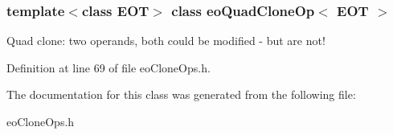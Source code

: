 \subsubsection*{template$<$class EOT$>$ class eo\-Quad\-Clone\-Op$<$ EOT $>$}

Quad clone: two operands, both could be modified - but are not! 



Definition at line 69 of file eo\-Clone\-Ops.h.

The documentation for this class was generated from the following file:\begin{CompactItemize}
\item 
eo\-Clone\-Ops.h\end{CompactItemize}
